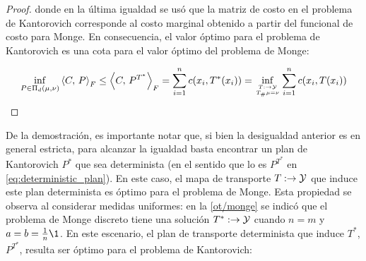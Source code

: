 \begin{proof}
	donde en la última igualdad se usó que la matriz de costo en el problema de Kantorovich corresponde al costo marginal obtenido a partir del funcional de costo para Monge. En consecuencia, el valor óptimo para el problema de Kantorovich es una cota para el valor óptimo del problema de Monge:

	\begin{equation*}
		\inf_{P\in \Pi_d(\mu,\nu)} \dotproduct{C}{P}_F
		\leq \dotproduct{C}{P^{T^*}}_F
		= \sum_{i=1}^{n} c(x_i, T^*(x_i))
		= \inf_{\feasible{T:\xspace\to\yspace}{T_\#\mu=\nu}} \sum_{i=1}^n c(x_i,T(x_i))
	\end{equation*}
\end{proof}

De la demostración, es importante notar que, si bien la desigualdad anterior es en general estricta, para alcanzar la igualdad basta encontrar un plan de Kantorovich $P^*$ que sea determinista (en el sentido que lo es $P^{T^*}$ en \eqref{eq:deterministic_plan}). En este caso, el mapa de transporte $T:\to\mathcal{Y}$ que induce este plan determinista es óptimo para el problema de Monge. Esta propiedad se observa al considerar medidas uniformes: en la \autoref{ot/monge} se indicó que el problema de Monge discreto tiene una solución $T^*:\to\mathcal{Y}$ cuando $n=m$ y $a=b=\frac{1}{n}\1$. En este escenario, el plan de transporte determinista que induce $T^*$, $P^{T^*}$, resulta ser óptimo para el problema de Kantorovich:


